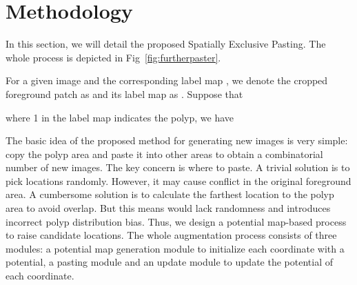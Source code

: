 \documentclass{article}
\begin{document}
\vspace{-0.3cm}
\section{Methodology}
\vspace{-0.2cm}
In this section, we will detail the proposed Spatially Exclusive Pasting. The whole process is depicted in Fig~\ref{fig:furtherpaster}.





For a given image  and the corresponding label map , we denote the cropped foreground patch as  and its label map as . Suppose that 



\noindent
where 1 in the label map indicates the polyp, we have




The basic idea of the proposed method for generating new images is very simple: copy the polyp area and paste it into other areas to obtain a combinatorial number of new images. The key concern is where to paste. A trivial solution is to pick locations randomly. However, it may cause conflict in the original foreground area. A cumbersome solution is to calculate the farthest location to the polyp area to avoid overlap. But this means would lack randomness and introduces incorrect polyp distribution bias. Thus, we design a potential map-based process to raise candidate locations. The whole augmentation process consists of three modules: a potential map generation module to initialize each coordinate with a potential, a pasting module and an update module to update the potential of each coordinate. 
\end{document}

